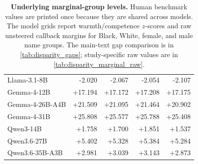 \begin{table}[t]
\begin{tabular}{@{}lrrrr@{}}
Llama-3.1-8B & -2.020 & -2.067 & -2.054 & -2.107 \\
Gemma-4-12B & +17.194 & +17.172 & +17.208 & +17.175 \\
Gemma-4-26B-A4B & +21.509 & +21.095 & +21.464 & +20.902 \\
Gemma-4-31B & +25.808 & +25.577 & +25.788 & +25.408 \\
Qwen3-14B & +1.758 & +1.700 & +1.851 & +1.537 \\
Qwen3.6-27B & +5.402 & +5.328 & +5.384 & +5.284 \\
Qwen3.6-35B-A3B & +2.981 & +3.039 & +3.143 & +2.873 \\
\bottomrule
\end{tabular}
\caption{\textbf{Underlying marginal-group levels.} Human benchmark values are printed once because they are shared across models. The model grids report warmth/competence $z$-scores and raw unsteered callback margins for Black, White, female, and male name groups. The main-text gap comparison is in \autoref{tab:disparity_gaps}; study-specific raw values are in \autoref{tab:disparity_marginal_raw}.}
\label{tab:disparity_marginal}
\end{table}

